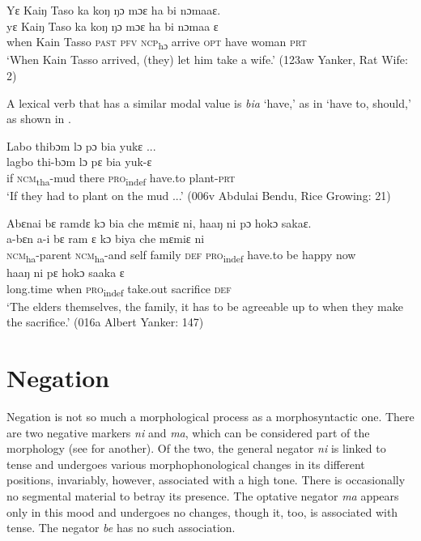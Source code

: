 \ex Yɛ Kaiŋ Taso ka koŋ ŋɔ mɔɛ ha bi nɔmaaɛ.\\
    \gll yɛ      Kaiŋ  Taso    ka    koŋ  ŋɔ      mɔɛ    ha    bi    nɔmaa  ɛ\\
    when    Kain  Tasso    \textsc{past}  \textsc{pfv}  \textsc{ncp}\textsubscript{hɔ}    arrive    \textsc{opt}  have  woman  \textsc{prt}\\
    \glt ‘When Kain Tasso arrived, (they) let him take a wife.' (123aw Yanker, Rat Wife: 2)
\z
\z

A lexical verb that has a similar modal value is \textit{bia} ‘have,' as in ‘have to, should,' as shown in .

\ea%
    \label{ex:130}
    \ea Labo thibɔm lɔ pɔ bia yukɛ ...\\
    \gll lagbo    thi-bɔm      lɔ    pɛ      bia    yuk-ɛ\\
    if      \textsc{ncm}\textsubscript{tha}{}-mud    there  \textsc{pro}\textsubscript{indef}  have.to  plant-\textsc{prt}\\
    \glt ‘If they had to plant on the mud ...' (006v Abdulai Bendu, Rice Growing: 21)

\ex  Abɛnai bɛ ramdɛ kɔ bia che mɛmiɛ ni, haaŋ ni pɔ hokɔ sakaɛ.\\
    \gll a-bɛn        a-i        bɛ    ram    ɛ    kɔ      biya    che  mɛmiɛ  ni\\
    \textsc{ncm}\textsubscript{ha}{}-parent  \textsc{ncm}\textsubscript{ha}{}-and  self  family  \textsc{def}  \textsc{pro}\textsubscript{indef}  have.to  be    happy  now\\
    \gll haaŋ      ni      pɛ      hokɔ      saaka      ɛ\\
    long.time  when    \textsc{pro}\textsubscript{indef}  take.out    sacrifice    \textsc{def}\\
    \glt ‘The elders themselves, the family, it has to be agreeable up to when they make the sacrifice.' (016a Albert Yanker: 147)
\z
\z

\section{Negation}
\hypertarget{Toc115517786}{}\label{sec:4.5}
Negation is not so much a morphological process as a morphosyntactic one. There are two negative markers \textit{ni} and \textit{ma}, which can be considered part of the morphology (see  for another). Of the two, the general negator \textit{ni} is linked to tense and undergoes various morphophonological changes in its different positions, invariably, however, associated with a high tone. There is occasionally no segmental material to betray its presence. The optative negator \textit{ma} appears only in this mood and undergoes no changes, though it, too, is associated with tense. The negator \textit{be} has no such association.

